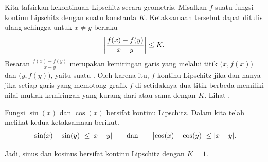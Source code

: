 Kita tafsirkan kekontinuan Lipschitz secara geometris.  Misalkan $f$ suatu fungsi
kontinu Lipschitz dengan suatu konstanta $K$.  Ketaksamaan tersebut dapat ditulis ulang
sehingga untuk $x \neq y$ berlaku
\begin{equation*}
\left\lvert {\frac{f(x)-f(y)}{x-y}} \right\rvert \leq K .
\end{equation*}
Besaran $\frac{f(x)-f(y)}{x-y}$ merupakan kemiringan garis
yang melalui titik $\bigl(x,f(x)\bigr)$
dan $\bigl(y,f(y)\bigr)$, yaitu suatu \emph{}.  Oleh karena itu, $f$
kontinu Lipschitz jika dan hanya jika setiap garis yang memotong grafik $f$ di setidaknya dua
titik berbeda memiliki nilai mutlak kemiringan yang kurang dari atau sama dengan $K$.
Lihat .
\begin{myfigureht}
\caption{Kemiringan suatu garis sekan.
Suatu fungsi bersifat Lipschitz jika %
$\abs{\frac{f(x)-f(y)}{x-y}} \leq K$ untuk semua $x$ dan $y$.\label{fig:lipschitz}}
\end{myfigureht}

\begin{example}
Fungsi $\sin(x)$ dan $\cos(x)$ bersifat kontinu Lipschitz.
Dalam  kita telah melihat kedua ketaksamaan berikut.
\begin{equation*}
\bigl\lvert {\sin(x)-\sin(y)} \bigr\rvert 
\leq \lvert {x-y} \rvert
\qquad \text{dan} \qquad
\bigl\lvert {\cos(x)-\cos(y)} \bigr\rvert
\leq \lvert {x-y} \rvert .
\end{equation*}

Jadi, sinus dan kosinus bersifat kontinu Lipschitz dengan $K=1$.
\end{example}

